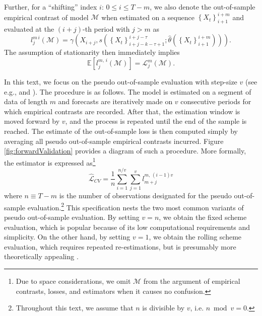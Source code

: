 \documentclass[11pt,dvipsnames]{article}
\begin{document}
Further, for a ``shifting'' index  $i:\, 0 \leq i \leq T-m$, we also denote the out-of-sample empirical contrast of model $ \mathcal{M} $ when estimated on a sequence $ \left\lbrace X_{t} \right\rbrace_{i+1}^{i+m} $ and evaluated at the $ (i+j) $-th period with $ j>m $ as
\begin{equation}\label{eq:EmpContrastDef} 
l_{j}^{m\,i}\left(\mathcal{M} \right)=\gamma\left( X_{i+j}, s\left(\left\lbrace X_{t} \right\rbrace_{i+j-k-\tau+1}^{i+j-\tau}; \widehat{\theta}\left(  \left\lbrace X_{t} \right\rbrace_{i+1}^{i+m} \right)\right)   \right) . 
\end{equation}
The assumption of stationarity then immediately implies
\begin{equation} \label{eq:EEmpContrast} 
\mathbb{E}\left[l_{j}^{m,\,i}\left(\mathcal{M} \right)\right]=\mathcal{L}_{j}^{m}\left(\mathcal{M} \right).
\end{equation}

In this text, we focus on the pseudo out-of-sample evaluation with step-size $ v $ (see e.g., \citet{callenNeuralNetworkForecasting1996} and \citet{swansonForecastingEconomicTime1997}). The procedure is as follows. The model is estimated on a segment of data of length $ m $ and forecasts are iteratively made on $ v $ consecutive periods for which empirical contrasts are recorded. After that, the estimation window is moved forward by $ v $, and the process is repeated until the end of the sample is reached. The estimate of the out-of-sample loss is then computed simply by averaging all pseudo out-of-sample empirical contrasts incurred. Figure \ref{fig:forwardValidation} provides a diagram of such a procedure. More formally, the estimator is expressed as\footnote{Due to space considerations, we omit $ \mathcal{M} $ from the argument of empirical contrasts, losses, and estimators when it causes no confusion.}
\begin{equation}\label{eq:FVdef} 
\widehat{\mathcal{L}}_{CV}=\dfrac{1}{n}\sum_{i=1}^{n/v}  \sum_{j=1}^{v} l_{m+j}^{m,\,(i-1)v }
\end{equation}
where $ n\equiv T-m $ is the number of observations designated for the pseudo out-of-sample evaluation.\footnote{Throughout this text, we assume that $ n $ is divisible by $ v $, i.e. $ n \bmod v =0 $.} This specification nests the two most common variants of pseudo out-of-sample evaluation. By setting $ v=n $, we obtain the fixed scheme evaluation, which is popular because of its low computational requirements and simplicity. On the other hand, by setting $ v=1 $, we obtain the rolling scheme evaluation, which requires repeated re-estimations, but is presumably more theoretically appealing \citep{swansonForecastingEconomicTime1997}.
\end{document}
